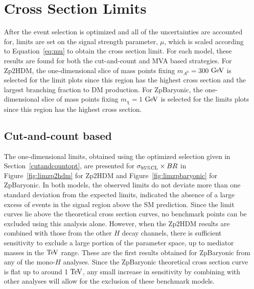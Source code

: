 \section{Cross Section Limits}

After the event selection is optimized and all of the uncertainties are accounted for, limits are set on the signal strength parameter, $\mu$, which is scaled according to Equation~\ref{eq:mu} to obtain the cross section limit. For each model, these results are found for both the cut-and-count and MVA based strategies. For Zp2HDM, the one-dimensional slice of mass points fixing $m_{A^0} = 300$ $\mathrm{Ge\kern -0.1em V}$ is selected for the limit plots since this region has the highest cross section and the largest branching fraction to DM production. For ZpBaryonic, the one-dimensional slice of mass points fixing $m_{\chi} = 1$ $\mathrm{Ge\kern -0.1em V}$ is selected for the limits plots since this region has the highest cross section.

\subsection{Cut-and-count based}

The one-dimensional limits, obtained using the optimized selection given in Section~\ref{cutandcountopt}, are presented for $\sigma_{95\% \rm{CL}}\times BR$ in Figure~\ref{fig:limzp2hdm} for Zp2HDM and Figure~\ref{fig:limzpbaryonic} for ZpBaryonic. In both models, the observed limits do not deviate more than one standard deviation from the expected limits, indicated the absence of a large excess of events in the signal region above the SM prediction. Since the limit curves lie above the theoretical cross section curves, no benchmark points can be excluded using this analysis alone. However, when the Zp2HDM results are combined with those from the other $H$ decay channels, there is sufficient sensitivity to exclude a large portion of the parameter space, up to mediator masses in the $\mathrm{Te\kern -0.1em V}$ range. These are the first results obtained for ZpBaryonic from any of the mono-$H$ analyses. Since the ZpBaryonic theoretical cross section curve is flat up to around 1 $\mathrm{Te\kern -0.1em V}$, any small increase in sensitivity by combining with other analyses will allow for the exclusion of these benchmark models. 

